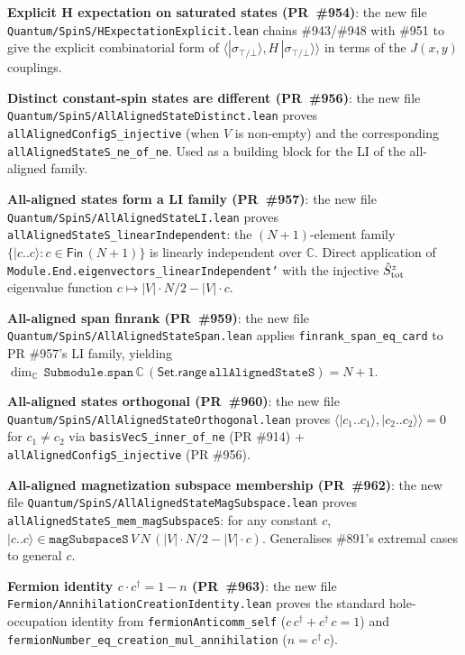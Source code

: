 \documentclass[a4paper,11pt]{article}
\begin{document}
\textbf{Explicit H expectation on saturated states (PR~\#954)}: the
new file \texttt{Quantum/SpinS/HExpectationExplicit.lean} chains
\#943/\#948 with \#951 to give the explicit combinatorial form of
$\langle|\sigma_{\top/\bot}\rangle, H\,|\sigma_{\top/\bot}\rangle\rangle$
in terms of the $J(x,y)$ couplings.

\textbf{Distinct constant-spin states are different (PR~\#956)}:
the new file \texttt{Quantum/SpinS/AllAlignedStateDistinct.lean}
proves \texttt{allAlignedConfigS\_injective} (when $V$ is non-empty)
and the corresponding \texttt{allAlignedStateS\_ne\_of\_ne}.
Used as a building block for the LI of the all-aligned family.

\textbf{All-aligned states form a LI family (PR~\#957)}: the new
file \texttt{Quantum/SpinS/AllAlignedStateLI.lean} proves
\texttt{allAlignedStateS\_linearIndependent}: the
$(N+1)$-element family $\{|c..c\rangle : c \in \textsf{Fin}\,(N+1)\}$
is linearly independent over $\mathbb{C}$. Direct application of
\texttt{Module.End.eigenvectors\_linearIndependent'} with the
injective $\hat{S}^z_{\rm tot}$ eigenvalue function
$c \mapsto |V|\cdot N/2 - |V|\cdot c$.

\textbf{All-aligned span finrank (PR~\#959)}: the new file
\texttt{Quantum/SpinS/AllAlignedStateSpan.lean} applies
\texttt{finrank\_span\_eq\_card} to PR \#957's LI family,
yielding $\dim_\mathbb{C}\,\texttt{Submodule.span}\,\mathbb{C}\,
(\textsf{Set.range}\,\texttt{allAlignedStateS}) = N + 1$.

\textbf{All-aligned states orthogonal (PR~\#960)}: the new file
\texttt{Quantum/SpinS/AllAlignedStateOrthogonal.lean} proves
$\langle|c_1..c_1\rangle, |c_2..c_2\rangle\rangle = 0$ for
$c_1 \neq c_2$ via \texttt{basisVecS\_inner\_of\_ne} (PR \#914) +
\texttt{allAlignedConfigS\_injective} (PR \#956).

\textbf{All-aligned magnetization subspace membership (PR~\#962)}:
the new file
\texttt{Quantum/SpinS/AllAlignedStateMagSubspace.lean} proves
\texttt{allAlignedStateS\_mem\_magSubspaceS}: for any constant
$c$, $|c..c\rangle \in \texttt{magSubspaceS}\,V\,N\,(|V|\cdot N/2
- |V|\cdot c)$. Generalises \#891's extremal cases to general $c$.

\textbf{Fermion identity $c\cdot c^\dagger = 1 - n$ (PR~\#963)}:
the new file \texttt{Fermion/AnnihilationCreationIdentity.lean}
proves the standard hole-occupation identity from
\texttt{fermionAnticomm\_self} ($c\,c^\dagger + c^\dagger\,c = 1$)
and \texttt{fermionNumber\_eq\_creation\_mul\_annihilation}
($n = c^\dagger\,c$).
\end{document}
